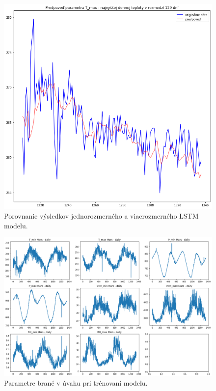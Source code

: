 \begin{figure}[!htbp]
  \centering
  \includegraphics[width=14cm]{img/multilstm.png}
  \caption{Porovnanie výsledkov jednorozmerného a viacrozmerného LSTM modelu.}
  \label{multilstm}
\end{figure}

\begin{figure}[!htbp]
  \centering
  \includegraphics[width=14cm]{img/features.png}
  \caption{Parametre brané v úvahu pri trénovaní modelu.}
  \label{features}
\end{figure}

